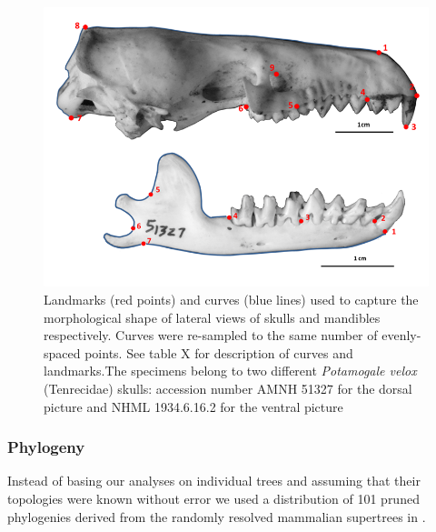 \documentclass[12pt,a4paper]{article}
\begin{document}
	\begin{figure}[H]
	\centering
	\includegraphics[width=1\linewidth]{figures/SkLat+mands_landmark_diagrams.png}
	
	\caption{Landmarks (red points) and curves (blue lines) used to capture the morphological shape of lateral views of skulls and mandibles respectively. Curves were re-sampled to the same number of evenly-spaced points. See table X for description of curves and landmarks.The specimens belong to two different \textit{Potamogale velox} (Tenrecidae) skulls: accession number AMNH 51327 for the dorsal picture and NHML 1934.6.16.2 for the ventral picture}
	
	\label{fig:sklat_mands_landmarks}
	\end{figure}
%


\subsubsection{Phylogeny} 
	Instead of basing our analyses on individual trees and assuming that their topologies were known without error \citep[e.g.][]{Ruta2013, Foth2012, Brusatte2008, Harmon2003} we used a distribution of 101 pruned phylogenies derived from the randomly resolved mammalian supertrees in \citep{Kuhn2011}. 
\end{document}
